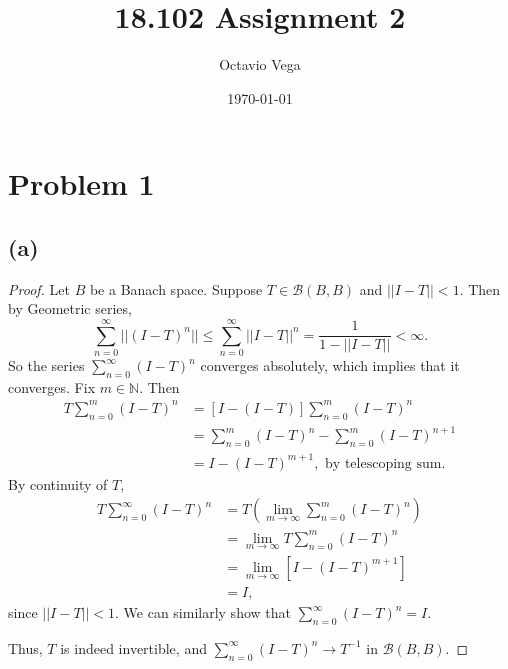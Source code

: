 \documentclass{article}
\title{18.102 Assignment 2}
\author{Octavio Vega}
\date\today
\begin{document}
\maketitle
	
\section*{Problem 1}
\subsection*{(a)}
\begin{proof}
	Let $B$ be a Banach space. Suppose $T \in \mathcal{B}(B,B)$ and $||I-T||<1$. Then by Geometric series, 
	\begin{equation}
		\sum_{n=0}^{\infty} ||(I-T)^n|| \leq \sum_{n=0}^{\infty} ||I-T||^n = \frac{1}{1-||I-T||}<\infty.
	\end{equation}
	So the series $\sum_{n=0}^{\infty} (I-T)^n$ converges absolutely, which implies that it converges. Fix $m\in\mathbb{N}$. Then
	\begin{align}
		T\sum_{n=0}^m (I-T)^n &= [I-(I-T)]\sum_{n=0}^m (I-T)^n \\
		&= \sum_{n=0}^m (I-T)^n - \sum_{n=0}^m (I-T)^{n+1} \\
		&= I - (I-T)^{m+1}, \textrm{ by telescoping sum.}
	\end{align}
	By continuity of $T$, 
	\begin{align}
		T\sum_{n=0}^{\infty}(I-T)^n &= T\left(\lim_{m\to\infty}\sum_{n=0}^m (I-T)^n\right)\\
		&= \lim_{m\to\infty} T \sum_{n=0}^m (I-T)^n \\
		&= \lim_{m\to\infty}\left[I - (I-T)^{m+1}\right] \\
		&= I,
	\end{align}
	since $||I-T||<1$.
	We can similarly show that $\sum_{n=0}^{\infty}(I-T)^n = I$.
	
	Thus, $T$ is indeed invertible, and $\sum_{n=0}^{\infty} (I-T)^n \rightarrow T^{-1}$ in $\mathcal{B}(B,B)$.
\end{proof}
\end{document}
